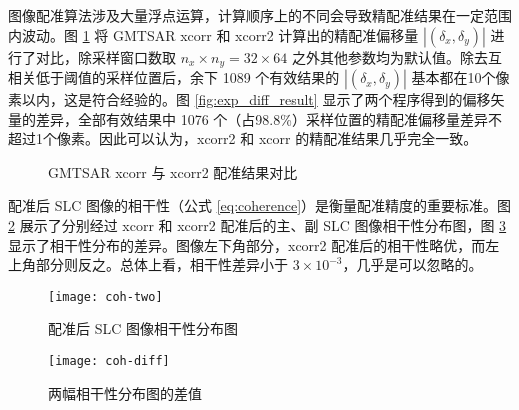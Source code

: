 图像配准算法涉及大量浮点运算，计算顺序上的不同会导致精配准结果在一定范围内波动。图 \ref{fig:exp_result} 将 GMTSAR xcorr 和 xcorr2 计算出的精配准偏移量 $|(\delta_x, \delta_y)|$ 进行了对比，除采样窗口数取 $n_x\times n_y = 32 \times 64$ 之外其他参数均为默认值。除去互相关低于阈值的采样位置后，余下 1089 个有效结果的 $|(\delta_x, \delta_y)|$ 基本都在10个像素以内，这是符合经验的。图 \ref{fig:exp_diff_result} 显示了两个程序得到的偏移矢量的差异，全部有效结果中 1076 个（占98.8\%）采样位置的精配准偏移量差异不超过1个像素。因此可以认为，xcorr2 和 xcorr 的精配准结果几乎完全一致。

\begin{figure}[htbp]
\centering
{}
\caption{GMTSAR xcorr 与 xcorr2 配准结果对比} \label{fig:exp_result}
\end{figure}

配准后 SLC 图像的相干性（公式 \ref{eq:coherence}）是衡量配准精度的重要标准。图 \ref{fig:coh-two} 展示了分别经过 xcorr 和 xcorr2 配准后的主、副 SLC 图像相干性分布图，图 \ref{fig:coh-diff} 显示了相干性分布的差异。图像左下角部分，xcorr2 配准后的相干性略优，而左上角部分则反之。总体上看，相干性差异小于 $3 \times 10^{-3}$，几乎是可以忽略的。

\begin{figure}[htbp]
\centering
\texttt{[image: coh-two]}
\caption{配准后 SLC 图像相干性分布图} \label{fig:coh-two}
\end{figure}


\begin{figure}[htbp]
\centering
\texttt{[image: coh-diff]}
\caption{两幅相干性分布图的差值} \label{fig:coh-diff}
\end{figure}
